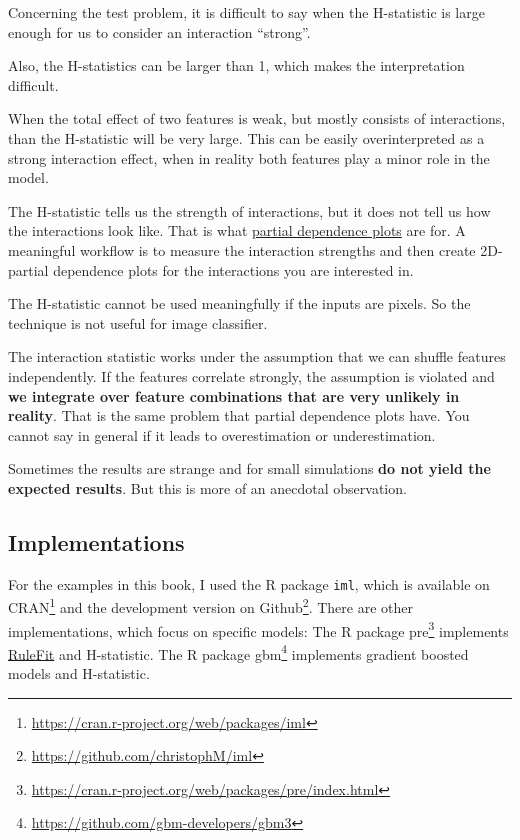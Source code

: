 \documentclass[12pt,]{krantz}
\renewcommand{\href}[2]{#2\footnote{\url{#1}}}
\begin{document}
Concerning the test problem, it is difficult to say when the H-statistic
is large enough for us to consider an interaction ``strong''.

Also, the H-statistics can be larger than 1, which makes the
interpretation difficult.

When the total effect of two features is weak, but mostly consists of
interactions, than the H-statistic will be very large. This can be
easily overinterpreted as a strong interaction effect, when in reality
both features play a minor role in the model.

The H-statistic tells us the strength of interactions, but it does not
tell us how the interactions look like. That is what
\protect\hyperlink{pdp}{partial dependence plots} are for. A meaningful
workflow is to measure the interaction strengths and then create
2D-partial dependence plots for the interactions you are interested in.

The H-statistic cannot be used meaningfully if the inputs are pixels. So
the technique is not useful for image classifier.

The interaction statistic works under the assumption that we can shuffle
features independently. If the features correlate strongly, the
assumption is violated and \textbf{we integrate over feature
combinations that are very unlikely in reality}. That is the same
problem that partial dependence plots have. You cannot say in general if
it leads to overestimation or underestimation.

Sometimes the results are strange and for small simulations \textbf{do
not yield the expected results}. But this is more of an anecdotal
observation.

\subsection{Implementations}\label{implementations}

For the examples in this book, I used the R package \texttt{iml}, which
is available on \href{https://cran.r-project.org/web/packages/iml}{CRAN}
and the development version on
\href{https://github.com/christophM/iml}{Github}. There are other
implementations, which focus on specific models: The R package
\href{https://cran.r-project.org/web/packages/pre/index.html}{pre}
implements \protect\hyperlink{rulefit}{RuleFit} and H-statistic. The R
package \href{https://github.com/gbm-developers/gbm3}{gbm} implements
gradient boosted models and H-statistic.
\end{document}
